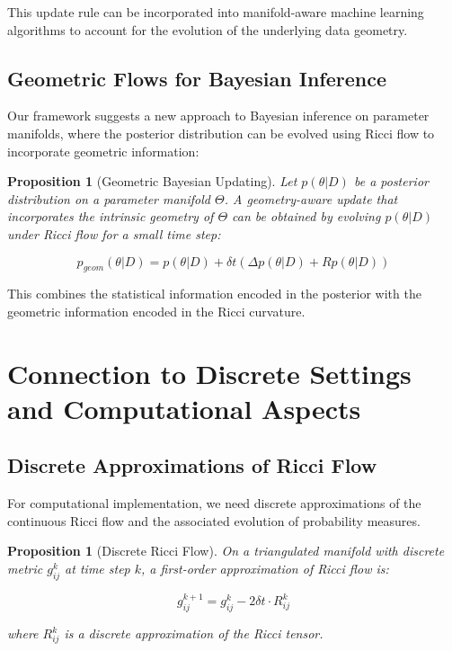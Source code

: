 \documentclass[12pt,a4paper]{article}
\newtheorem{proposition}[theorem]{Proposition}
\begin{document}
This update rule can be incorporated into manifold-aware machine learning algorithms to account for the evolution of the underlying data geometry.

\subsection{Geometric Flows for Bayesian Inference}

Our framework suggests a new approach to Bayesian inference on parameter manifolds, where the posterior distribution can be evolved using Ricci flow to incorporate geometric information:

\begin{proposition}[Geometric Bayesian Updating]
Let $p(\theta|D)$ be a posterior distribution on a parameter manifold $\Theta$. A geometry-aware update that incorporates the intrinsic geometry of $\Theta$ can be obtained by evolving $p(\theta|D)$ under Ricci flow for a small time step:

\begin{equation}
p_{geom}(\theta|D) = p(\theta|D) + \delta t (\Delta p(\theta|D) + R p(\theta|D))
\end{equation}
\end{proposition}

This combines the statistical information encoded in the posterior with the geometric information encoded in the Ricci curvature.

\section{Connection to Discrete Settings and Computational Aspects}

\subsection{Discrete Approximations of Ricci Flow}

For computational implementation, we need discrete approximations of the continuous Ricci flow and the associated evolution of probability measures.

\begin{proposition}[Discrete Ricci Flow]
On a triangulated manifold with discrete metric $g_{ij}^k$ at time step $k$, a first-order approximation of Ricci flow is:

\begin{equation}
g_{ij}^{k+1} = g_{ij}^k - 2\delta t \cdot R_{ij}^k
\end{equation}

\noindent where $R_{ij}^k$ is a discrete approximation of the Ricci tensor.
\end{proposition}
\end{document}
